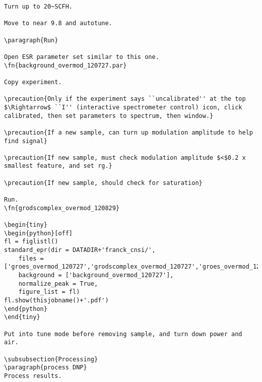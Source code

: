 \begin{scriptsize}
\begin{python}[off]
\begin{scriptsize}
\begin{lstlisting}
Turn up to 20~SCFH.

Move to near 9.8 and autotune.

\paragraph{Run}

Open ESR parameter set similar to this one.
\fn{background_overmod_120727.par}

Copy experiment.

\precaution{Only if the experiment says ``uncalibrated'' at the top $\Rightarrow$ ``I'' (interactive spectrometer control) icon, click calibrated, then set parameters to spectrum, then window.}

\precaution{If a new sample, can turn up modulation amplitude to help find signal}

\precaution{If new sample, must check modulation amplitude $<$0.2 x smallest feature, and set rg.}

\precaution{If new sample, should check for saturation}

Run.
\fn{grodscomplex_overmod_120829}

\begin{tiny}
\begin{python}[off]
fl = figlistl()
standard_epr(dir = DATADIR+'franck_cnsi/',
    files = ['groes_overmod_120727','grodscomplex_overmod_120727','groes_overmod_120828','grodscomplex_overmod_120727'],
    background = ['background_overmod_120727'],
    normalize_peak = True,
    figure_list = fl)
fl.show(thisjobname()+'.pdf')
\end{python}
\end{tiny}

Put into tune mode before removing sample, and turn down power and air.

\subsubsection{Processing}
\paragraph{process DNP}
Process results.


\end{lstlisting}
\end{scriptsize}
\end{python}
\end{scriptsize}
